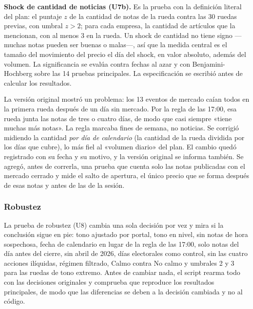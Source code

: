 \textbf{Shock de cantidad de noticias (U7b).} Es la prueba con la definición literal del
plan: el puntaje $z$ de la cantidad de notas de la rueda contra las 30 ruedas previas, con
umbral $z>2$; para cada empresa, la cantidad de artículos que la mencionan, con al menos 3 en
la rueda. Un shock de cantidad no tiene signo —muchas notas pueden ser buenas o malas—, así que
la medida central es el tamaño del movimiento del precio el día del shock, en valor absoluto,
además del volumen. La significancia se evalúa contra fechas al azar y con Benjamini-Hochberg
sobre las 14 pruebas principales. La especificación se escribió antes de calcular los
resultados.

La versión original mostró un problema: los 13 eventos de mercado caían todos en la primera
rueda después de un día sin mercado. Por la regla de las 17:00, esa rueda junta las notas de
tres o cuatro días, de modo que casi siempre «tiene muchas más notas». La regla marcaba fines
de semana, no noticias. Se corrigió midiendo la cantidad \textit{por día de calendario} (la
cantidad de la rueda dividida por los días que cubre), lo más fiel al «volumen diario» del
plan. El cambio quedó registrado con su fecha y su motivo, y la versión original se informa
también. Se agregó, antes de correrla, una prueba que cuenta solo las notas publicadas con el
mercado cerrado y mide el salto de apertura, el único precio que se forma después de esas notas
y antes de las de la sesión.

\subsubsection{Robustez}

La prueba de robustez (U8) cambia una sola decisión por vez y mira si la conclusión sigue en
pie: tono ajustado por portal, tono en nivel, sin notas de hora sospechosa, fecha de calendario
en lugar de la regla de las 17:00, solo notas del día antes del cierre, sin abril de 2026,
días electorales como control, sin las cuatro acciones ilíquidas, régimen filtrado, Calmo
contra No calmo y umbrales 2 y 3 para las ruedas de tono extremo. Antes de cambiar nada, el
script rearma todo con las decisiones originales y comprueba que reproduce los resultados
principales, de modo que las diferencias se deben a la decisión cambiada y no al código.
